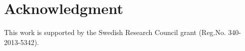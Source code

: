 \documentclass[journal,onecolumn]{IEEEtran}
\begin{document}
\section*{Acknowledgment}

This work is supported by the Swedish Research Council grant (Reg.No. 340-2013-5342).


\ifCLASSOPTIONcaptionsoff
  \newpage
\fi




\end{document}
